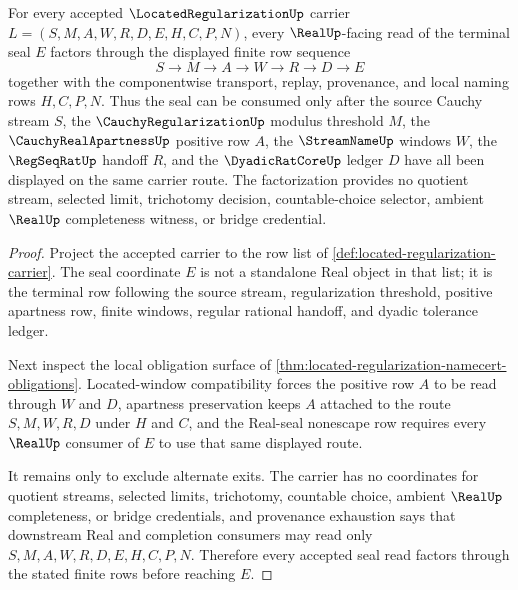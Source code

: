 \begin{theorem}
\label{thm:located-regularization-real-seal-factorization}
For every accepted $\LocatedRegularizationUp$ carrier $L=(S,M,A,W,R,D,E,H,C,P,N)$, every $\RealUp$-facing read of the terminal seal $E$ factors through the displayed finite row sequence
$$
S \longrightarrow M \longrightarrow A \longrightarrow W \longrightarrow R \longrightarrow D \longrightarrow E
$$
together with the componentwise transport, replay, provenance, and local naming rows $H,C,P,N$. Thus the seal can be consumed only after the source Cauchy stream $S$, the $\CauchyRegularizationUp$ modulus threshold $M$, the $\CauchyRealApartnessUp$ positive row $A$, the $\StreamNameUp$ windows $W$, the $\RegSeqRatUp$ handoff $R$, and the $\DyadicRatCoreUp$ ledger $D$ have all been displayed on the same carrier route. The factorization provides no quotient stream, selected limit, trichotomy decision, countable-choice selector, ambient $\RealUp$ completeness witness, or bridge credential.
\end{theorem}
\begin{proof}
Project the accepted carrier to the row list of \autoref{def:located-regularization-carrier}. The seal coordinate $E$ is not a standalone Real object in that list; it is the terminal row following the source stream, regularization threshold, positive apartness row, finite windows, regular rational handoff, and dyadic tolerance ledger.

Next inspect the local obligation surface of \autoref{thm:located-regularization-namecert-obligations}. Located-window compatibility forces the positive row $A$ to be read through $W$ and $D$, apartness preservation keeps $A$ attached to the route $S,M,W,R,D$ under $H$ and $C$, and the Real-seal nonescape row requires every $\RealUp$ consumer of $E$ to use that same displayed route.

It remains only to exclude alternate exits. The carrier has no coordinates for quotient streams, selected limits, trichotomy, countable choice, ambient $\RealUp$ completeness, or bridge credentials, and provenance exhaustion says that downstream Real and completion consumers may read only $S,M,A,W,R,D,E,H,C,P,N$. Therefore every accepted seal read factors through the stated finite rows before reaching $E$.
\end{proof}


